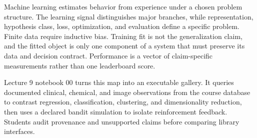\begin{chapterreview}
Machine learning estimates behavior from experience under a chosen problem
structure. The learning signal distinguishes major branches, while
representation, hypothesis class, loss, optimization, and evaluation define a
specific problem. Finite data require inductive bias. Training fit is not the
generalization claim, and the fitted object is only one component of a system
that must preserve its data and decision contract. Performance is a vector of
claim-specific measurements rather than one leaderboard score.
\end{chapterreview}

\begin{notebooklink}
Lecture 9 notebook 00 turns this map into an executable gallery. It queries
documented clinical, chemical, and image observations from the course database
to contrast regression, classification, clustering, and dimensionality
reduction, then uses a declared bandit simulation to isolate reinforcement
feedback. Students audit provenance and unsupported claims before comparing
library interfaces.
\end{notebooklink}
